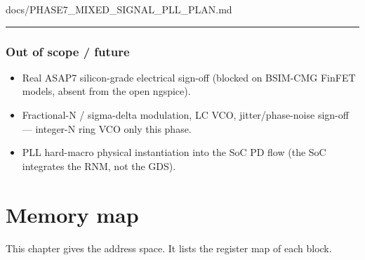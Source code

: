 \begin{relocated}{docs/PHASE7_MIXED_SIGNAL_PLL_PLAN.md}
{}

\begin{center}\rule{0.5\linewidth}{0.5pt}\end{center}

\subsection{Out of scope / future}\label{ds:ch:phase7-pll-plan:10-out-of-scope-future}

\begin{itemize}
\tightlist
\item
  Real ASAP7 silicon-grade electrical sign-off (blocked on BSIM-CMG
  FinFET models, absent from the open ngspice).
\item
  Fractional-N / sigma-delta modulation, LC VCO,
  jitter/\allowbreak{}phase-noise sign-off --- integer-N ring VCO only
  this phase.
\item
  PLL hard-macro physical instantiation into the SoC PD flow (the SoC
  integrates the RNM, not the GDS).
\end{itemize}
\end{relocated}

\chapter{Memory map}\label{ds:ch:memory-map}

This chapter gives the address space. It lists the register map of each block.

